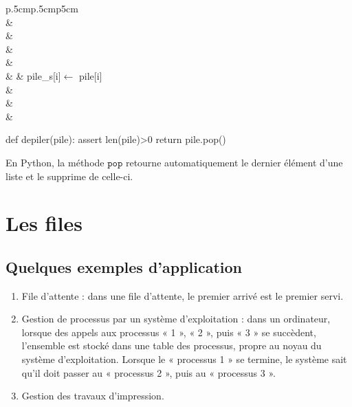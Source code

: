 \documentclass[10pt,fleqn]{article} %
\begin{document}
\noindent \begin{minipage}[c]{.48\linewidth}
\begin{pseudo}
\begin{tabular}{p{.5cm}p{.5cm}p{5cm}}
\hline
{}  \\
& \\
& \\
& \\
& \\
& & pile\_s[i]$\leftarrow$ pile[i]\\
& \\
& \\
& \\

\hline
\end{tabular}
\end{pseudo}
\end{minipage}\hfill
\begin{minipage}[c]{.48\linewidth}
\begin{py}
\begin{python}
def depiler(pile):
    assert len(pile)>0
    return pile.pop()
\end{python}
\end{py}
\end{minipage}
\begin{rem}
En Python, la méthode $\texttt{pop}$ retourne automatiquement le dernier élément d'une liste et le supprime de celle-ci.
\end{rem}

\section{Les files}
\subsection{Quelques exemples d'application}

\begin{enumerate}
\item File d’attente : dans une file d’attente, le premier arrivé est le premier servi.
\item Gestion de processus par un système d’exploitation : dans un ordinateur, lorsque des appels aux processus « 1 », « 2 », puis « 3 » se succèdent, l’ensemble est stocké dans une table des processus, propre au noyau du système d’exploitation. Lorsque le « processus 1 » se termine, le système sait qu’il doit passer au « processus 2 », puis au « processus 3 ».
\item Gestion des travaux d'impression.
\end{enumerate}
\end{document}
